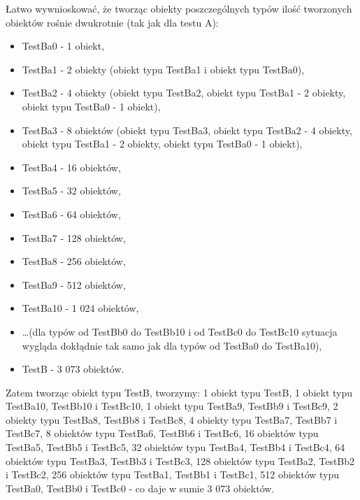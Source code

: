 \documentclass[12pt]{article}
\begin{document}
Łatwo wywnioskować, że tworząc obiekty poszczególnych typów ilość tworzonych obiektów rośnie dwukrotnie (tak jak dla testu A):
\begin{itemize}
	\item TestBa0 - 1 obiekt,
	\item TestBa1 - 2 obiekty (obiekt typu TestBa1 i obiekt typu TestBa0),
	\item TestBa2 - 4 obiekty (obiekt typu TestBa2, obiekt typu TestBa1 - 2 obiekty, obiekt typu TestBa0 - 1 obiekt),
	\item TestBa3 - 8 obiektów (obiekt typu TestBa3, obiekt typu TestBa2 - 4 obiekty, obiekt typu TestBa1 - 2 obiekty, obiekt typu TestBa0 - 1 obiekt),
	\item TestBa4 - 16 obiektów,
	\item TestBa5 - 32 obiektów,
	\item TestBa6 - 64 obiektów,
	\item TestBa7 - 128 obiektów,
	\item TestBa8 - 256 obiektów,
	\item TestBa9 - 512 obiektów,
	\item TestBa10 - 1 024 obiektów,
	\item \ldots (dla typów od TestBb0 do TestBb10 i od TestBc0 do TestBc10 sytuacja wygląda dokłądnie tak samo jak dla typów od TestBa0 do TestBa10),
	\item TestB - 3 073 obiektów.
\end{itemize}
Zatem tworząc obiekt typu TestB, tworzymy: 1 obiekt typu TestB, 1 obiekt typu TestBa10, TestBb10 i TestBc10, 1 obiekt typu TestBa9, TestBb9 i TestBc9, 2 obiekty typu TestBa8, TestBb8 i TestBc8, 4 obiekty typu TestBa7, TestBb7 i TestBc7, 8 obiektów typu TestBa6, TestBb6 i TestBc6, 16 obiektów typu TestBa5, TestBb5 i TestBc5, 32 obiektów typu TestBa4, TestBb4 i TestBc4, 64 obiektów typu TestBa3, TestBb3 i TestBc3, 128 obiektów typu TestBa2, TestBb2 i TestBc2, 256 obiektów typu TestBa1, TestBb1 i TestBc1, 512 obiektów typu TestBa0, TestBb0 i TestBc0 - co daje w sumie 3 073 obiektów.
\end{document}
